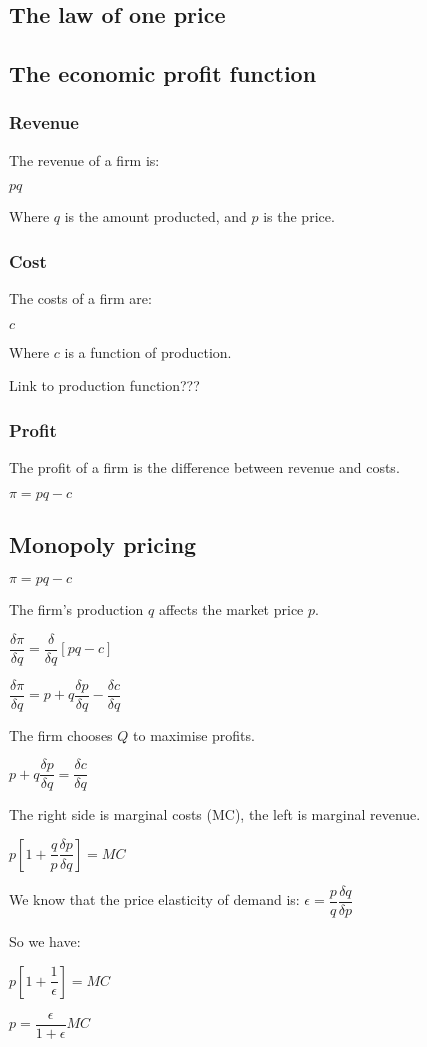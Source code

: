 
\subsection{The law of one price}

\subsection{The economic profit function}

\subsubsection{Revenue}

The revenue of a firm is:

\(pq\)

Where \(q\) is the amount producted, and \(p\) is the price.

\subsubsection{Cost}

The costs of a firm are:

\(c\)

Where \(c\) is a function of production.

Link to production function???


\subsubsection{Profit}

The profit of a firm is the difference between revenue and costs.

\(\pi = pq-c\)



\subsection{Monopoly pricing}

\(\pi = pq-c\)

The firm's production \(q\) affects the market price \(p\).

\(\dfrac{\delta \pi }{\delta q}= \dfrac{\delta }{\delta q} [pq-c]\)

\(\dfrac{\delta \pi }{\delta q}= p+q\dfrac{\delta p}{\delta q}-\dfrac{\delta c}{\delta q}\)

The firm chooses \(Q\) to maximise profits.

\(p+q\dfrac{\delta p}{\delta q}=\dfrac{\delta c}{\delta q}\)

The right side is marginal costs (MC), the left is marginal revenue.

\(p[1+\dfrac{q}{p}\dfrac{\delta p}{\delta q}]=MC\)

We know that the price elasticity of demand is: \(\epsilon = \dfrac{p}{q}\dfrac{\delta q}{\delta p}\)

So we have:

\(p[1+\dfrac{1 }{\epsilon }]=MC\)

\(p=\dfrac{\epsilon }{1+\epsilon }MC\)



